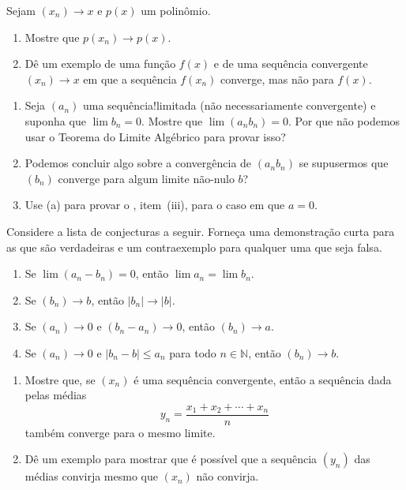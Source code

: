 \begin{exercise}\label{ex:2-3-8}
Sejam $(x_n) \to x$ e $p(x)$ um polinômio.
\begin{enumerate}[label=(\alph*)]
\item Mostre que $p(x_n) \to p(x)$.
\item Dê um exemplo de uma função $f(x)$ e de uma sequência convergente $(x_n) \to x$ em que a sequência $f(x_n)$ converge, mas não para $f(x)$.
\end{enumerate}
\end{exercise}

\bigskip 

\begin{exercise}\label{ex:2-3-9}
\begin{enumerate}[label=(\alph*)]
\item Seja $(a_n)$ uma sequência!limitada (não necessariamente convergente) e suponha que $\lim b_n = 0$. Mostre que $\lim(a_n b_n) = 0$. Por que não podemos usar o Teorema do Limite Algébrico para provar isso?
\item Podemos concluir algo sobre a convergência de $(a_n b_n)$ se supusermos que $(b_n)$ converge para algum limite não-nulo $b$?
\item Use (a) para provar o , item~(iii), para o caso em que $a = 0$.
\end{enumerate}
\end{exercise}

\begin{exercise}\label{ex:2-3-10}
Considere a lista de conjecturas a seguir. Forneça uma demonstração curta para as que são verdadeiras e um contraexemplo para qualquer uma que seja falsa.
\begin{enumerate}[label=(\alph*)]
\item Se $\lim(a_n - b_n) = 0$, então $\lim a_n = \lim b_n$.
\item Se $(b_n) \to b$, então $|b_n| \to |b|$.
\item Se $(a_n) \to 0$ e $(b_n - a_n) \to 0$, então $(b_n) \to a$.
\item Se $(a_n) \to 0$ e $|b_n - b| \leq a_n$ para todo $n \in \mathbb{N}$, então $(b_n) \to b$.
\end{enumerate}
\end{exercise}

\begin{exercise}\label{ex:2-3-11}
\begin{enumerate}[label=(\alph*)]
\item Mostre que, se $(x_n)$ é uma sequência convergente, então a sequência dada pelas médias
\[
y_n = \frac{x_1 + x_2 + \cdots + x_n}{n}
\]
também converge para o mesmo limite.
\item Dê um exemplo para mostrar que é possível que a sequência $(y_n)$ das médias convirja mesmo que $(x_n)$ não convirja.
\end{enumerate}
\end{exercise}

